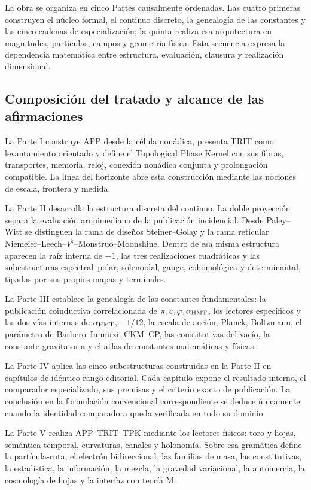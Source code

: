 La obra se organiza en cinco Partes causalmente ordenadas. Las cuatro
primeras construyen el núcleo formal, el continuo discreto, la genealogía de
las constantes y las cinco cadenas de especialización; la quinta realiza esa arquitectura
en magnitudes, partículas, campos y geometría física. Esta secuencia expresa
la dependencia matemática entre estructura, evaluación, clausura y
realización dimensional.

\subsection*{Composición del tratado y alcance de las afirmaciones}

La Parte I construye APP desde la célula nonádica, presenta TRIT como
levantamiento orientado y define el Topological Phase Kernel con sus fibras,
transportes, memoria, reloj, conexión nonádica conjunta y prolongación
compatible. La línea del horizonte abre esta construcción mediante las
nociones de escala, frontera y medida.

La Parte II desarrolla la estructura discreta del continuo. La doble
proyección separa la evaluación arquimediana de la publicación incidencial.
Desde Paley--Witt se distinguen la rama de diseños Steiner--Golay y la rama
reticular Niemeier--Leech--\(V^\natural\)--Monstruo--Moonshine. Dentro de esa misma estructura
aparecen la raíz interna de \(-1\), las tres realizaciones cuadráticas y las
subestructuras espectral--polar, solenoidal, gauge, cohomológica y
determinantal, tipadas por sus propios mapas y terminales.

La Parte III establece la genealogía de las constantes fundamentales: la
publicación coinductiva correlacionada de
\(\pi,e,\varphi,\alpha_{\rm HMT}\), los lectores específicos y las dos vías
internas de \(\alpha_{\rm HMT}\), \(-1/12\), la escala de acción, Planck,
Boltzmann, el parámetro de Barbero--Immirzi, CKM--CP, las constitutivas del
vacío, la constante gravitatoria y el atlas de constantes matemáticas y
físicas.

La Parte IV aplica las cinco subestructuras construidas en la Parte II en
capítulos de idéntico rango editorial. Cada capítulo expone el resultado
interno, el comparador especializado, sus premisas y el criterio exacto de
publicación. La conclusión en la formulación convencional correspondiente se
deduce únicamente cuando la identidad comparadora queda verificada en todo su
dominio.

La Parte V realiza APP--TRIT--TPK mediante los lectores físicos: toro y hojas,
semántica temporal, curvaturas, canales y holonomía. Sobre esa gramática
define la partícula-ruta, el electrón bidireccional, las familias de masa,
las constitutivas, la estadística, la información, la mezcla, la gravedad
variacional, la autoinercia, la cosmología de hojas y la interfaz con teoría
M.

